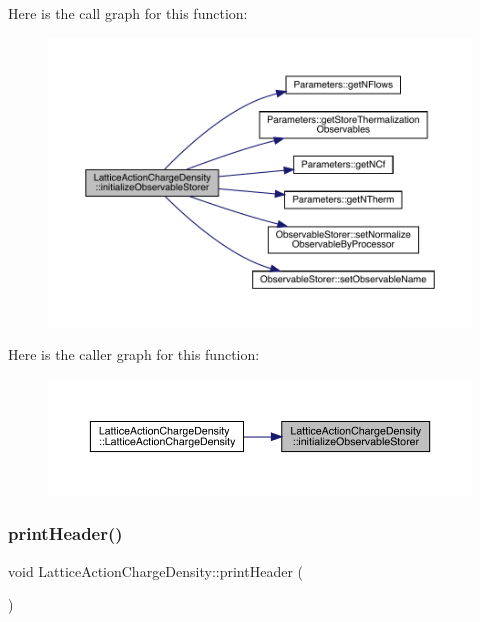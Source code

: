 Here is the call graph for this function\+:
\nopagebreak
\begin{figure}[H]
\begin{center}
\leavevmode
\includegraphics[width=350pt]{class_lattice_action_charge_density_aba3131bbe5bd930adccc2852b4d44bb9_cgraph}
\end{center}
\end{figure}
Here is the caller graph for this function\+:
\nopagebreak
\begin{figure}[H]
\begin{center}
\leavevmode
\includegraphics[width=350pt]{class_lattice_action_charge_density_aba3131bbe5bd930adccc2852b4d44bb9_icgraph}
\end{center}
\end{figure}
\mbox{\label{class_lattice_action_charge_density_a2a7a806862f23975161316a37f47f22e}} 
\subsubsection{\texorpdfstring{printHeader()}{printHeader()}}
{\footnotesize\ttfamily void Lattice\+Action\+Charge\+Density\+::print\+Header (\begin{DoxyParamCaption}{ }\end{DoxyParamCaption})\hspace{0.3cm}{\ttfamily [virtual]}}




